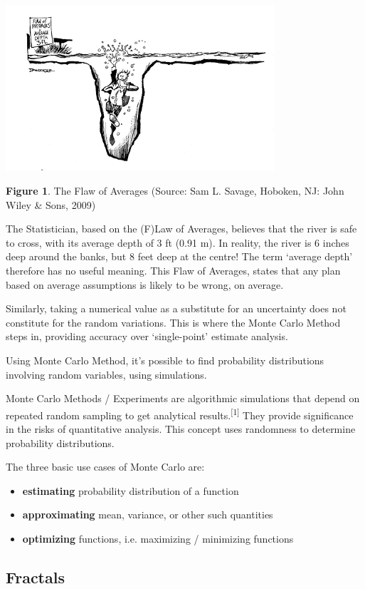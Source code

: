 \documentclass{resonance}
\begin{document}
	\includegraphics[width=10cm]{the-flaw-of-averages}
	
	\scriptsize{\textbf{Figure 1}. The Flaw of Averages (Source: Sam L. Savage, Hoboken, NJ: John Wiley \& Sons, 2009)}
	
	\normalsize
	The Statistician, based on the (F)Law of Averages, believes that the river is safe to cross, with its average depth of 3 ft (0.91 m). In reality, the river is 6 inches deep around the banks, but 8 feet deep at the centre! The term ‘average depth’ therefore has no useful meaning. This Flaw of Averages, states that any plan based on average assumptions is likely to be wrong, on average.
	
	Similarly, taking a numerical value as a substitute for an uncertainty does not constitute for the random variations. This is where the Monte Carlo Method steps in, providing accuracy over ‘single-point' estimate analysis.
	
	Using Monte Carlo Method, it's possible to find probability distributions involving random variables, using simulations.
	
	Monte Carlo Methods / Experiments are algorithmic simulations that depend on repeated random sampling to get analytical results.\textsuperscript{[1]} They provide significance in the risks of quantitative analysis. This concept uses randomness to determine probability distributions.
	
	The three basic use cases of Monte Carlo are:
	\begin{itemize}
		\item \textbf{estimating} probability distribution of a function
		\item \textbf{approximating} mean, variance, or other such quantities
		\item \textbf{optimizing} functions, i.e. maximizing / minimizing functions
	\end{itemize}
	
	\subsection*{Fractals}
	
\end{document}
